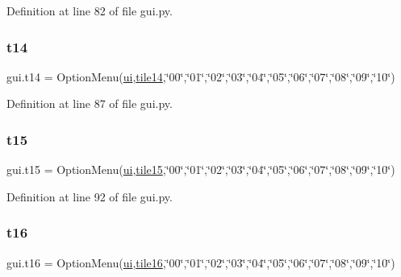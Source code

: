 Definition at line 82 of file gui.\+py.

\mbox{\label{namespacegui_a69a6fe1ecfb625203761aef0d5d54058}} 
\subsubsection{\texorpdfstring{t14}{t14}}
{\footnotesize\ttfamily gui.\+t14 = Option\+Menu(\mbox{\hyperlink{namespacegui_a40ab7281456eadbea2dc2038f5c24fa1}{ui}},\mbox{\hyperlink{namespacegui_a5cf77212c983a05affbe474cb1364620}{tile14}},\char`\"{}00\char`\"{},\char`\"{}01\char`\"{},\char`\"{}02\char`\"{},\char`\"{}03\char`\"{},\char`\"{}04\char`\"{},\char`\"{}05\char`\"{},\char`\"{}06\char`\"{},\char`\"{}07\char`\"{},\char`\"{}08\char`\"{},\char`\"{}09\char`\"{},\char`\"{}10\char`\"{})}



Definition at line 87 of file gui.\+py.

\mbox{\label{namespacegui_a3ced2b879aca16d02ca39dc98473f8db}} 
\subsubsection{\texorpdfstring{t15}{t15}}
{\footnotesize\ttfamily gui.\+t15 = Option\+Menu(\mbox{\hyperlink{namespacegui_a40ab7281456eadbea2dc2038f5c24fa1}{ui}},\mbox{\hyperlink{namespacegui_a4e71059635ebf9d3f27d42d153a8cd3b}{tile15}},\char`\"{}00\char`\"{},\char`\"{}01\char`\"{},\char`\"{}02\char`\"{},\char`\"{}03\char`\"{},\char`\"{}04\char`\"{},\char`\"{}05\char`\"{},\char`\"{}06\char`\"{},\char`\"{}07\char`\"{},\char`\"{}08\char`\"{},\char`\"{}09\char`\"{},\char`\"{}10\char`\"{})}



Definition at line 92 of file gui.\+py.

\mbox{\label{namespacegui_a51b462c2a4622a8017621387cf619f5d}} 
\subsubsection{\texorpdfstring{t16}{t16}}
{\footnotesize\ttfamily gui.\+t16 = Option\+Menu(\mbox{\hyperlink{namespacegui_a40ab7281456eadbea2dc2038f5c24fa1}{ui}},\mbox{\hyperlink{namespacegui_acbacb920e84bd9606a9c5d5f9e948d8c}{tile16}},\char`\"{}00\char`\"{},\char`\"{}01\char`\"{},\char`\"{}02\char`\"{},\char`\"{}03\char`\"{},\char`\"{}04\char`\"{},\char`\"{}05\char`\"{},\char`\"{}06\char`\"{},\char`\"{}07\char`\"{},\char`\"{}08\char`\"{},\char`\"{}09\char`\"{},\char`\"{}10\char`\"{})}



